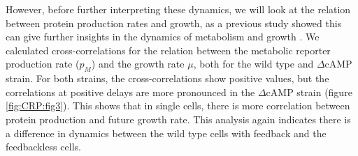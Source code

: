 However, before further interpreting these dynamics, 
we will look at the relation between protein production rates and growth, 
as a previous study showed this can give further insights in the dynamics of metabolism and growth \cite{Kiviet2014}.
%
%
%
%
We %
calculated cross-correlations for 
the relation between the metabolic reporter production rate ($p_M$) and the growth rate $\mu$,
both for the wild type and $\Delta$cAMP strain.
%
For both strains, the cross-correlations show positive values, 
but the correlations at positive delays are more pronounced in the $\Delta$cAMP strain (figure \ref{fig:CRP:fig3}).
%
This shows that in single \dcamp cells, there is more correlation between protein production and future growth rate.
%
This analysis 
again 
indicates there is a difference in dynamics between the wild type cells with feedback and the feedbackless cells.





